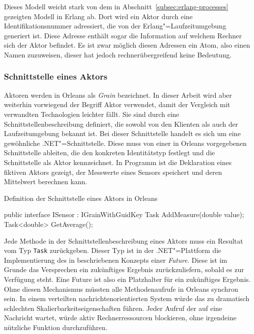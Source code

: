 Dieses Modell weicht stark von dem in Abschnitt~\ref{subsec:erlang-processes} gezeigten Modell in Erlang ab. Dort wird ein Aktor durch eine Identifikationsnummer adressiert, die von der Erlang"=Laufzeitumgebung generiert ist. Diese Adresse enthält sogar die Information auf welchem Rechner sich der Aktor befindet. Es ist zwar möglich diesen Adressen ein Atom, also einen Namen zuzuweisen, dieser hat jedoch rechnerübergreifend keine Bedeutung.

\subsubsection{Schnittstelle eines Aktors}

Aktoren werden in Orleans als \textit{Grain} bezeichnet. In dieser Arbeit wird aber weiterhin vorwiegend der Begriff Aktor verwendet, damit der Vergleich mit verwandten Technologien leichter fällt. Sie sind durch eine Schnittstellenbeschreibung definiert, die sowohl von den Klienten als auch der Laufzeitumgebung bekannt ist. Bei dieser Schnittstelle handelt es sich um eine gewöhnliche .NET"=Schnittstelle. Diese muss von einer in Orleans vorgegebenen Schnittstelle ableiten, die den konkreten Identitätstyp festlegt und die Schnittstelle als Aktor kennzeichnet. In Programm ist die Deklaration eines fiktiven Aktors gezeigt, der Messwerte eines Sensors speichert und deren Mittelwert berechnen kann.

\begin{program}[!hbt]
\caption{Definition der Schnittstelle eines Aktors in Orleans}
\label{prog:orleans-interface}
\begin{CsCode}
public interface ISensor : IGrainWithGuidKey {
	Task AddMeasure(double value);
	Task<double> GetAverage();
}
\end{CsCode}
\end{program}

Jede Methode in der Schnittstellenbeschreibung eines Aktors muss ein Resultat vom Typ \lstinline{Task} zurückgeben. Dieser Typ ist in der .NET"=Plattform die Implementierung des in \cite{Baker:1977:IGC:800228.806932} beschriebenen Konzepts einer \textit{Future}. Diese ist im Grunde das Versprechen ein zukünftiges Ergebnis zurückzuliefern, sobald es zur Verfügung steht. Eine Future ist also ein Platzhalter für ein zukünftiges Ergebnis. Ohne diesen Mechanismus müssten alle Methodenaufrufe in Orleans synchron sein. In einem verteilten nachrichtenorientierten System würde das zu dramatisch schlechten Skalierbarkeitseigenschaften führen. Jeder Aufruf der auf eine Nachricht wartet, würde aktiv Rechnerressourcen blockieren, ohne irgendeine nützliche Funktion durchzuführen.

